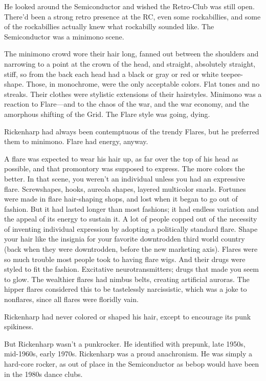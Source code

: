 He looked around the Semiconductor and wished the Retro-Club was still open. There’d been a strong retro presence at the RC, even some rockabillies, and some of the rockabillies actually knew what rockabilly sounded like. The Semiconductor was a minimono scene.

The minimono crowd wore their hair long, fanned out between the shoulders and narrowing to a point at the crown of the head, and straight, absolutely straight, stiff, so from the back each head had a black or gray or red or white teepee-shape. Those, in monochrome, were the only acceptable colors. Flat tones and no streaks. Their clothes were stylistic extensions of their hairstyles. Minimono was a reaction to Flare—and to the chaos of the war, and the war economy, and the amorphous shifting of the Grid. The Flare style was going, dying.

Rickenharp had always been contemptuous of the trendy Flares, but he preferred them to minimono. Flare had energy, anyway.

A flare was expected to wear his hair up, as far over the top of his head as possible, and that promontory was supposed to express. The more colors the better. In that scene, you weren’t an individual unless you had an expressive flare. Screwshapes, hooks, aureola shapes, layered multicolor snarls. Fortunes were made in flare hair-shaping shops, and lost when it began to go out of fashion. But it had lasted longer than most fashions; it had endless variation and the appeal of its energy to sustain it. A lot of people copped out of the necessity of inventing individual expression by adopting a politically standard flare. Shape your hair like the insignia for your favorite downtrodden third world country (back when they were downtrodden, before the new marketing axis). Flares were so much trouble most people took to having flare wigs. And their drugs were styled to fit the fashion. Excitative neurotransmitters; drugs that made you seem to glow. The wealthier flares had nimbus belts, creating artificial auroras. The hipper flares considered this to be tastelessly narcissistic, which was a joke to nonflares, since all flares were floridly vain.

Rickenharp had never colored or shaped his hair, except to encourage its punk spikiness.

But Rickenharp wasn’t a punkrocker. He identified with prepunk, late 1950s, mid-1960s, early 1970s. Rickenharp was a proud anachronism. He was simply a hard-core rocker, as out of place in the Semiconductor as bebop would have been in the 1980s dance clubs.

